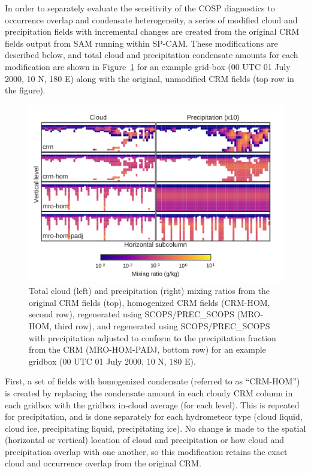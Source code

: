 In order to separately evaluate the sensitivity of the COSP diagnostics
to occurrence overlap and condensate heterogeneity, a series of modified
cloud and precipitation fields with incremental changes are created from
the original CRM fields output from SAM running within SP-CAM. These
modifications are described below, and total cloud and precipitation
condensate amounts for each modification are shown in
Figure~\ref{fig:mxratioExampleMro} for an example grid-box (00 UTC 01
July 2000, 10 N, 180 E) along with the original, unmodified CRM fields
(top row in the figure).

\begin{figure}[htbp]
\centering
\includegraphics{graphics/subgrid1_mxratio_example.pdf}
\caption{\label{fig:mxratioExampleMro}Total cloud (left) and
precipitation (right) mixing ratios from the original CRM fields (top),
homogenized CRM fields (CRM-HOM, second row), regenerated using
SCOPS/PREC\_SCOPS (MRO-HOM, third row), and regenerated using
SCOPS/PREC\_SCOPS with precipitation adjusted to conform to the
precipitation fraction from the CRM (MRO-HOM-PADJ, bottom row) for an
example gridbox (00 UTC 01 July 2000, 10 N, 180
E).}\label{fig:mxratioExampleMro}
\end{figure}

First, a set of fields with homogenized condensate (referred to as
``CRM-HOM'') is created by replacing the condensate amount in each
cloudy CRM column in each gridbox with the gridbox in-cloud average (for
each level). This is repeated for precipitation, and is done separately
for each hydrometeor type (cloud liquid, cloud ice, precipitating
liquid, precipitating ice). No change is made to the spatial (horizontal
or vertical) location of cloud and precipitation or how cloud and
precipitation overlap with one another, so this modification retains the
exact cloud and occurrence overlap from the original CRM.

